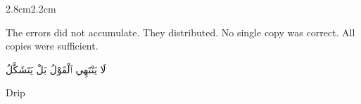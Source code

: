 \begin{center}
\end{center}

\vspace{0.5em}

\begin{center}
\end{center}

\vspace{0.5em}

\begin{center}
\end{center}

\vspace{3em}

\begin{adjustwidth}{2.8cm}{2.2cm}

The errors did not accumulate. They distributed. No single copy was correct.
All copies were sufficient.

\vspace{3em}

\end{adjustwidth}

\begin{center}
\end{center}

\vspace{3em}

\begin{center}
\end{center}

\vspace{3em}

\begin{center}

\smallskip


\smallskip

\end{center}

\vspace{3em}

\begin{center}
\begin{AR}
لَا يَنْتَهِي ٱلْقَوْلُ بَلْ يَتَشَكَّلُ
\end{AR}
\end{center}

\vspace{3em}

\begin{center}
\end{center}

\vspace{3em}

\begin{center}
Drip
\end{center}

\vspace{2em}

\begin{center}
\end{center}
